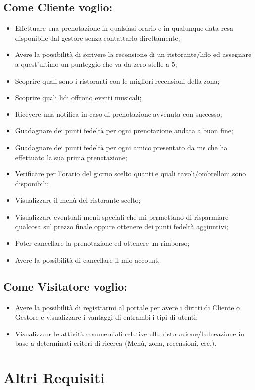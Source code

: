 \documentclass[a4paper]{article}
\begin{document}
\subsection{Come Cliente voglio:}
\begin{itemize}
\item Effettuare una prenotazione in qualsiasi orario e in qualunque data resa disponibile dal gestore senza contattarlo direttamente;
\item Avere la possibilità di scrivere la recensione di un ristorante/lido ed assegnare a quest'ultimo un punteggio che va da zero stelle a 5;
\item Scoprire quali sono i ristoranti con le migliori recensioni della zona;
\item Scoprire quali lidi offrono eventi musicali;
\item Ricevere una notifica in caso di prenotazione avvenuta con successo;
\item Guadagnare dei punti fedeltà per ogni prenotazione andata a buon fine;
\item Guadagnare dei punti fedeltà per ogni amico presentato da me che ha effettuato la sua prima prenotazione;
\item Verificare per l'orario del giorno scelto quanti e quali tavoli/ombrelloni sono disponibili;
\item Visualizzare il menù del ristorante scelto;
\item Visualizzare eventuali menù speciali che mi permettano di risparmiare qualcosa sul prezzo finale oppure ottenere dei punti fedeltà aggiuntivi;
\item Poter cancellare la prenotazione ed ottenere un rimborso;
\item Avere la possibilità di cancellare il mio account.
\end{itemize}

\subsection{Come Visitatore voglio:}
\begin{itemize}
\item Avere la possibilità di registrarmi al portale per avere i diritti di Cliente o Gestore e visualizzare i vantaggi di entrambi i tipi di utenti;

\item Visualizzare le attività commerciali relative alla ristorazione/balneazione in base a determinati criteri di ricerca (Menù, zona, recensioni, ecc.).
\end{itemize}
\section{Altri Requisiti}
\end{document}
